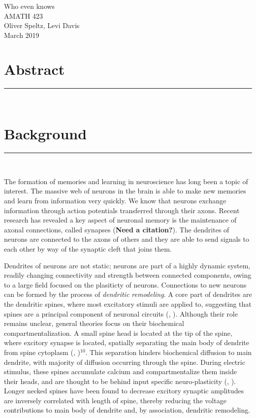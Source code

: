 \documentclass[12pt, a4paper]{article}
\newcommand{\blackbar}{{\nointerlineskip
{\rule{\linewidth}{1mm}}\\}}
\newcommand{\citeapa}[1]{(\citeauthor{#1}, \citeyear{#1})}
\begin{document}
\begin{titlepage}
\centering
\vspace*{5cm}
{\myfont Who even knows}\\
\vspace{1cm}
\Large{AMATH 423}\\
\vspace{1cm}
\Huge{Oliver Speltz, Levi Davis}\normalsize\\
\vspace{1cm}
\large{March 2019}\normalsize

\end{titlepage}
\doublespacing
\section*{Abstract}
\blackbar

\section*{Background}
\blackbar
The formation of memories and learning in neuroscience has long been a topic of interest. The massive web of neurons in the brain is able to make new memories and learn from information very quickly. We know that neurons exchange information through action potentials transferred through their axons. Recent research has revealed a key aspect of neuronal memory is the maintenance of axonal connections, called synapses (\large{\textbf{Need a citation?}})\normalsize. The dendrites of neurons are connected to the axons of others and they are able to send signals to each other by way of the synaptic cleft that joins them. 

Dendrites of neurons are not static; neurons are part of a highly dynamic system, readily changing connectivity and strength between connected components, owing to a large field focused on the plasiticty of neurons. Connections to new neurons can be formed by the process of \emph{dendritic remodeling}. A core part of dendrites are the dendritic spines, where most excitatory stimuli are applied to, suggesting that spines are a principal component of neuronal circuits \citeapa{dendriticspines}. Although their role remains unclear, general theories focus on their biochemical compartmentalization. A small spine head is located at the tip of the spine, where excitory synapse is located, spatially separating the main body of dendrite from spine cytoplasm \citeapa{dendriticspines}$^{10}$. This separation hinders biochemical diffusion to main dendrite, with majority of diffusion occurring through the spine. During electric stimulus, these spines accumulate calcium and compartmentalize them inside their heads, and are thought to be behind input specific neuro-plasticity \citeapa{dendriticspines}. Longer necked spines have been found to decrease excitory synaptic amplitudes are inversely correlated with length of spine, thereby reducing the voltage contributions to main body of dendrite and, by association, dendritic remodeling. 
\end{document}

